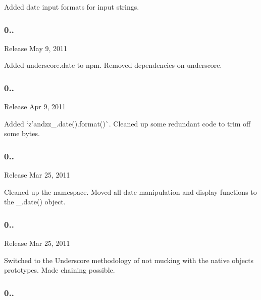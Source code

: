 Added date input formats for input strings.

\subsubsection*{0..}


\begin{DoxyItemize}
\item Release May 9, 2011
\end{DoxyItemize}

Added underscore.\+date to npm. Removed dependencies on underscore.

\subsubsection*{0..}


\begin{DoxyItemize}
\item Release Apr 9, 2011
\end{DoxyItemize}

Added `\textquotesingle{}z'{\ttfamily and}\textquotesingle{}zz\+\_\+.\+date().format()\`{}. Cleaned up some redundant code to trim off some bytes.

\subsubsection*{0..}


\begin{DoxyItemize}
\item Release Mar 25, 2011
\end{DoxyItemize}

Cleaned up the namespace. Moved all date manipulation and display functions to the \+\_\+.\+date() object.

\subsubsection*{0..}


\begin{DoxyItemize}
\item Release Mar 25, 2011
\end{DoxyItemize}

Switched to the Underscore methodology of not mucking with the native objects\textquotesingle{} prototypes. Made chaining possible.

\subsubsection*{0..}


